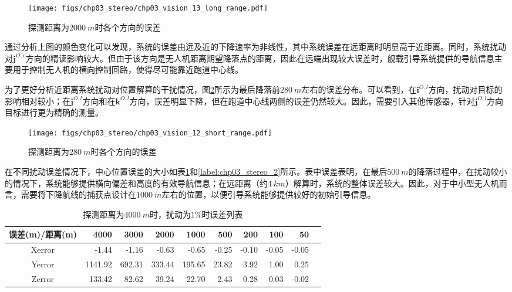 \begin{figure}[htb]
\centering
\texttt{[image: figs/chp03\_stereo/chp03\_vision\_13\_long\_range.pdf]}	
\caption{探测距离为$2000\ m$时各个方向的误差}
\label{fig:chp03_vision_13_long_range}
\end{figure}
通过分析上图的颜色变化可以发现，系统的误差由远及近的下降速率为非线性，其中系统误差在远距离时明显高于近距离。同时，系统扰动对$\mathbf{j}^{O,c}$方向的精读影响较大。但由于该方向是无人机距离期望降落点的距离，因此在远端出现较大误差时，舰载引导系统提供的导航信息主要用于控制无人机的横向控制回路，使得尽可能靠近跑道中心线。

为了更好分析近距离系统扰动对位置解算的干扰情况，图\ref{fig:chp03_vision_12_short_range}所示为最后降落前$280\ m$左右的误差分布。可以看到，在$\mathbf{i}^{O,l}$方向，扰动对目标的影响相对较小；在$\mathbf{j}^{O,l}$方向和在$\mathbf{k}^{O,l}$方向，误差明显下降，但在跑道中心线两侧的误差仍然较大。因此，需要引入其他传感器，针对$\mathbf{j}^{O,l}$方向目标进行更为精确的测量。

\begin{figure}[htb]
	\centering
	\texttt{[image: figs/chp03\_stereo/chp03\_vision\_12\_short\_range.pdf]}	
	\caption{探测距离为$280\ m$时各个方向的误差}
	\label{fig:chp03_vision_12_short_range}
\end{figure}


在不同扰动误差情况下，中心位置误差的大小如表\ref{label:chp03_stereo_1}和\ref{label:chp03_stereo_2}所示。表中误差表明，在最后$500\ m$的降落过程中，在扰动较小的情况下，系统能够提供横向偏差和高度的有效导航信息；在远距离（约$4\ km$）解算时，系统的整体误差较大。因此，对于中小型无人机而言，需要将下降航线的捕获点设计在$1000\ m$左右的位置，以便引导系统能够提供较好的初始引导信息。
\begin{table}[htb]
	\centering
	\caption{探测距离为$4000\ m$时，扰动为$1\%$时误差列表}
	\label{label:chp03_stereo_1}
	\begin{tabular}{crrrrrrrrr}
		\hline
		误差(m)/距离(m)     & 4000    & 3000   & 2000     & 1000  & 500   & 200   & 100   & 50     \\ \hline
		Xerror  & -1.44   & -1.16  & -0.63  & -0.65   & -0.25 & -0.10 & -0.05 & -0.05\\ 
		Yerror  & 1141.92 & 692.31 & 333.44 & 195.65  & 23.82 & 3.92  & 1.00  & 0.25   \\
		Zerror  & 133.42  & 82.62  & 39.24  & 22.70   & 2.43  & 0.28  & 0.03  & -0.02  \\ \hline
		
	\end{tabular}
\end{table}

